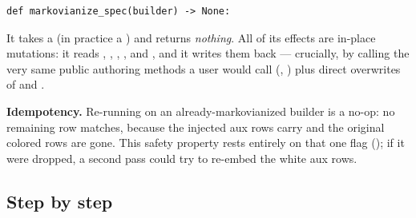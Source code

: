 \begin{lstlisting}
def markovianize_spec(builder) -> None:
\end{lstlisting}

It takes a  (in practice a ) and
returns \emph{nothing}. All of its effects are in-place mutations: it reads
, ,
, , and
, and it writes them back --- crucially, by calling
the very same public authoring methods a user would call
(, ) plus direct
overwrites of  and .

\begin{note}
\textbf{Idempotency.} Re-running  on an
already-markovianized builder is a no-op: no remaining row matches, because the
injected aux rows carry  and the original colored rows
are gone. This safety property rests entirely on that one flag
(); if it were dropped, a second
 pass could try to re-embed the white aux rows.
\end{note}

\subsection{Step by step}

